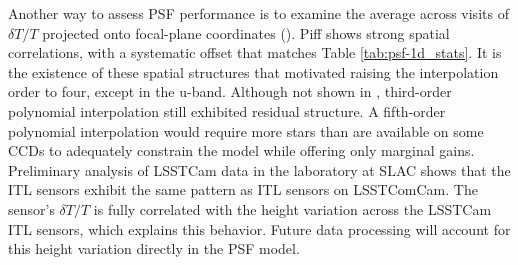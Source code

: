 Another way to assess \gls{PSF} performance is to examine the average
across visits of $\delta T/T$ projected onto focal-plane coordinates
().
Piff shows strong spatial correlations, with a systematic offset
that matches Table \ref{tab:psf-1d_stats}. It is the existence of these spatial structures that motivated raising the interpolation order to four, except in the u-band.
Although not shown in , third-order polynomial interpolation still exhibited residual structure.
A fifth-order polynomial interpolation would require more stars than are available on some CCDs to adequately constrain the model while offering only marginal gains.
Preliminary analysis of LSSTCam data in the laboratory at \gls{SLAC} shows that the \gls{ITL} sensors exhibit the same pattern as \gls{ITL} sensors on \gls{LSSTComCam}.
The sensor's $\delta T/T$ is fully correlated with the height variation across the LSSTCam \gls{ITL} sensors, which explains this behavior.
Future data processing will account for this height variation directly in the \gls{PSF} model.
